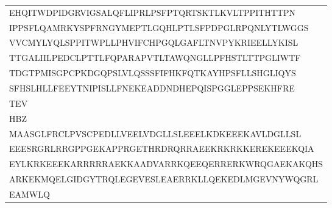 \begin{table}[htp]
\begin{center}
\begin{tabulary}{\textwidth}{|L|}
EHQITWDPIDGRVIGSALQFLIPRLPSFPTQRTSKTLKVLTPPITHTTPN \\
IPPSFLQAMRKYSPFRNGYMEPTLGQHLPTLSFPDPGLRPQNLYTLWGGS \\
VVCMYLYQLSPPITWPLLPHVIFCHPGQLGAFLTNVPYKRIEELLYKISL \\
TTGALIILPEDCLPTTLFQPARAPVTLTAWQNGLLPFHSTLTTPGLIWTF \\
TDGTPMISGPCPKDGQPSLVLQSSSFIFHKFQTKAYHPSFLLSHGLIQYS \\
SFHSLHLLFEEYTNIPISLLFNEKEADDNDHEPQISPGGLEPPSEKHFRE \\
TEV \bigstrut[b] \\
\hline
HBZ \bigstrut[t] \\
MAASGLFRCLPVSCPEDLLVEELVDGLLSLEEELKDKEEEKAVLDGLLSL \bigstrut[t] \\
EEESRGRLRRGPPGEKAPPRGETHRDRQRRAEEKRKRKKEREKEEEKQIA \\
EYLKRKEEEKARRRRRAEKKAADVARRKQEEQERRERKWRQGAEKAKQHS \\
ARKEKMQELGIDGYTRQLEGEVESLEAERRKLLQEKEDLMGEVNYWQGRL \\
EAMWLQ \bigstrut[b] \\
\hline
\end{tabulary}
\end{center}
\end{table}


